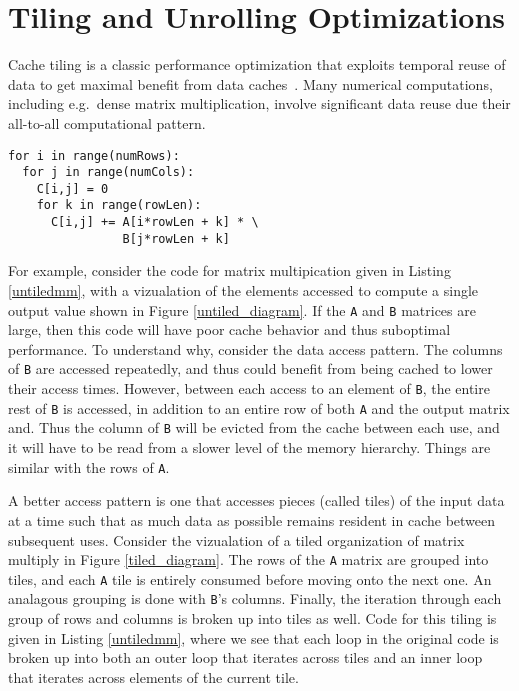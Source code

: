 \chapter{Tiling and Unrolling Optimizations\label{chap:optimizations}}

Cache tiling is a classic performance optimization that exploits temporal reuse of data to get maximal benefit from data caches~\cite{Lam91, Wolf91}.  Many numerical computations, including e.g.~dense matrix multiplication, involve significant data reuse due their all-to-all computational pattern.

\begin{lstlisting}[frame=single, label=untiledmm, caption={Untiled Matrix Multiply}, belowskip=0.5em]
for i in range(numRows):
  for j in range(numCols):
    C[i,j] = 0
    for k in range(rowLen):
      C[i,j] += A[i*rowLen + k] * \
                B[j*rowLen + k]
\end{lstlisting}

For example, consider the code for matrix multipication given in Listing \ref{untiledmm}, with a vizualation of the elements accessed to compute a single output value shown in Figure \ref{untiled_diagram}.  If the \lstinline{A} and \lstinline{B} matrices are large, then this code will have poor cache behavior and thus suboptimal performance.  To understand why, consider the data access pattern.  The columns of \lstinline{B} are accessed repeatedly, and thus could benefit from being cached to lower their access times.  However, between each access to an element of \lstinline{B}, the entire rest of \lstinline{B} is accessed, in addition to an entire row of both \lstinline{A} and the output matrix and.  Thus the column of \lstinline{B} will be evicted from the cache between each use, and it will have to be read from a slower level of the memory hierarchy.  Things are similar with the rows of \lstinline{A}.

A better access pattern is one that accesses pieces (called tiles) of the input data at a time such that as much data as possible remains resident in cache between subsequent uses.  Consider the vizualation of a tiled organization of matrix multiply in Figure \ref{tiled_diagram}.  The rows of the \lstinline{A} matrix are grouped into tiles, and each \lstinline{A} tile is entirely consumed before moving onto the next one.  An analagous grouping is done with \lstinline{B}'s columns.  Finally, the iteration through each group of rows and columns is broken up into tiles as well.  Code for this tiling is given in Listing \ref{untiledmm}, where we see that each loop in the original code is broken up into both an outer loop that iterates across tiles and an inner loop that iterates across elements of the current tile.


